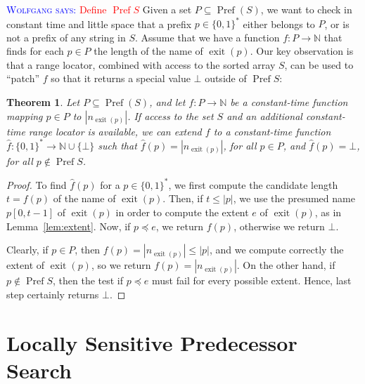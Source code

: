 \documentclass[a4paper,11pt]{article}
\newtheorem{theorem} {Theorem}[section]
\newcommand{\N}{\mathbb{N}}
\newcommand{\?}{\mskip1.5mu}
\DeclareMathOperator{\exit}{exit}
\DeclareMathOperator{\Pref}{Pref}
\newcommand{\aremark}[3]{\textcolor{blue}{\textsc{#1 #2:}}
  \textcolor{red}{\textsf{#3}}}
\newcommand{\wolfgang}[2][says]{\aremark{Wolfgang}{#1}{#2}}
\begin{document}
\wolfgang{Define $\Pref S$}
Given a set $P\subseteq \Pref(S)$, we want to check in constant time
and little space that a prefix $p \in \{0, 1\}^*$ either belongs 
to $P$, or is not a prefix of any string in $S$. Assume that we 
have a function $f : P \rightarrow \N$ that finds for each
$p\in P$ the length of the name of $\exit(p)$. 
Our key observation is that a range locator, combined with access 
to the sorted array $S$, can be used to ``patch''
$f$ so that it returns a special value $\bot$ outside of $\Pref S$:
\begin{theorem}
\label{th:pref}
Let $P \subseteq\Pref(S)$, and let $f: P \rightarrow \N$ be 
a constant-time function mapping $p \in P$ to $|n_{\exit(p)}|$. 
If access to the set $S$ and an additional
constant-time range locator is available, we can extend 
$f$ to a constant-time function $\widehat{f}: \{0, 1\}^* \rightarrow \N
\cup \{ \bot \}$ such that $\widehat{f}(p)=|n_{\exit(p)}|$, for 
all $p \in P$, and $\widehat{f}(p) = \bot$, for
all $p \not\in\Pref S$.
\end{theorem}
\begin{proof}

To find $\widehat{f}(p)$ for a $p \in \{0, 1\}^*$, 
we first compute the candidate length $t = f(p)$ of the name of 
$\exit(p)$. Then, if $t \leq |p|$, we use the presumed
name $p[0, t -1]$ of $\exit(p)$ in order to compute 
the extent $e$ of $\exit(p)$, as in Lemma~\ref{lem:extent}. Now, 
if $p  \preceq e$, we return $f(p)$, otherwise we return $\bot$.

Clearly, if $p\in P$, then $f(p) = |n_{\exit(p)}| \leq |p|$, and we
compute correctly the extent of $\exit(p)$, so we return 
$f(p)=|n_{\exit(p)}|$.
On the other hand, if $p \not\in \Pref S$, then the test if 
$p \preceq e$ must fail for every possible extent. 
Hence, last step certainly returns $\bot$.
\end{proof}


\section{Locally Sensitive Predecessor Search}
\label{sec:pred}
\end{document}
